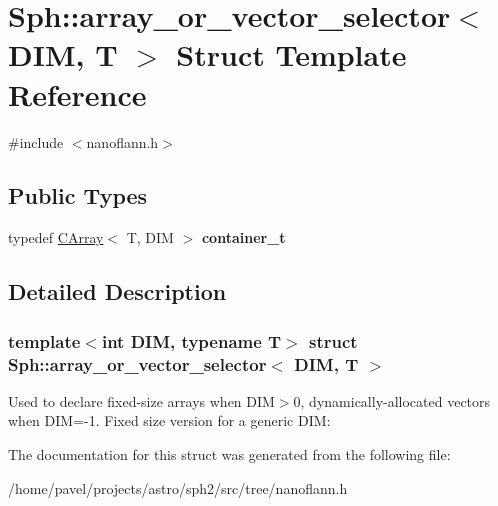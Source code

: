 \hypertarget{structSph_1_1array__or__vector__selector}{}\section{Sph\+:\+:array\+\_\+or\+\_\+vector\+\_\+selector$<$ D\+IM, T $>$ Struct Template Reference}
\label{structSph_1_1array__or__vector__selector}


{\ttfamily \#include $<$nanoflann.\+h$>$}

\subsection*{Public Types}
\begin{DoxyCompactItemize}
\item 
\hypertarget{structSph_1_1array__or__vector__selector_af60a03c0f085e18f62638e8221fd2954}{}\label{structSph_1_1array__or__vector__selector_af60a03c0f085e18f62638e8221fd2954} 
typedef \hyperlink{classSph_1_1CArray}{C\+Array}$<$ T, D\+IM $>$ {\bfseries container\+\_\+t}
\end{DoxyCompactItemize}


\subsection{Detailed Description}
\subsubsection*{template$<$int D\+IM, typename T$>$\newline
struct Sph\+::array\+\_\+or\+\_\+vector\+\_\+selector$<$ D\+I\+M, T $>$}

Used to declare fixed-\/size arrays when D\+IM$>$0, dynamically-\/allocated vectors when D\+IM=-\/1. Fixed size version for a generic D\+IM\+: 

The documentation for this struct was generated from the following file\+:\begin{DoxyCompactItemize}
\item 
/home/pavel/projects/astro/sph2/src/tree/nanoflann.\+h\end{DoxyCompactItemize}
